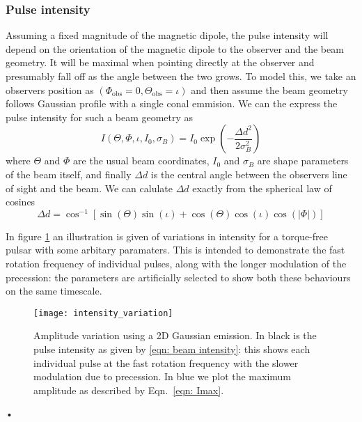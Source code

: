 \documentclass[/home/greg/Thesis/main/main.tex]{subfiles}
\begin{document}
\graphicspath{{/home/greg/Neutron_star_modelling/BeamwidthCalculation/img/}}

\newcommand{\ThetaO}{\Theta_{\mathrm{obs}}}
\newcommand{\PhiO}{\Phi_{\mathrm{obs}}}
\newcommand{\sigmaB}{\sigma_{B}}
\newcommand{\Imax}{I_{\textrm{max}}}

\subsubsection{Pulse intensity}

Assuming a fixed magnitude of the magnetic dipole, the pulse intensity will
depend on the orientation of the magnetic dipole to the observer and the beam
geometry. It will be maximal when pointing directly at the observer and
presumably fall off as the angle between the two grows. To model this, we take
an observers position as $(\PhiO=0, \ThetaO=\iota)$ and then assume the beam geometry
follows Gaussian profile with a single conal emmision.
We can the express the pulse intensity for such a beam geometry as
\begin{equation}
I
(\Theta, \Phi, \iota,  I_{0}, \sigmaB) 
=
I_{0} \exp\left(-\frac{\Delta d^{2}}{2\sigmaB^{2}}\right)
\label{eqn: beam intensity}
\end{equation}
where $\Theta$ and $\Phi$ are the usual beam coordinates, $I_{0}$ and $\sigmaB$
are shape parameters of the beam itself, and finally $\Delta d$ is the central
angle between the observers line of sight and the beam.
We can calulate $\Delta d$ exactly from the spherical law of cosines
\begin{equation}
\Delta d = \cos^{-1}\left[\sin(\Theta)\sin(\iota) +
                              \cos(\Theta)\cos(\iota)\cos(|\Phi|)\right]
\label{eqn: angular sep}
\end{equation}

In figure \ref{fig: intensity variation} an illustration is given of variations
in intensity for a torque-free pulsar with some arbitary paramaters. This is
intended to demonstrate the fast rotation frequency of individual pulses, along
with the longer modulation of the precession: the parameters are artificially
selected to show both these behaviours on the same timescale.
\begin{figure}[htb]
\centering
\texttt{[image: intensity\_variation]}
\caption{Amplitude variation using a 2D Gaussian emission. In black is the pulse
intensity as given by \eqref{eqn: beam intensity}: this shows each individual
pulse at the fast rotation frequency with the slower modulation due to precession. 
In blue we plot the maximum amplitude as described by Eqn.~\eqref{eqn: Imax}.}
\label{fig: intensity variation}
\end{figure}•
\end{document}
